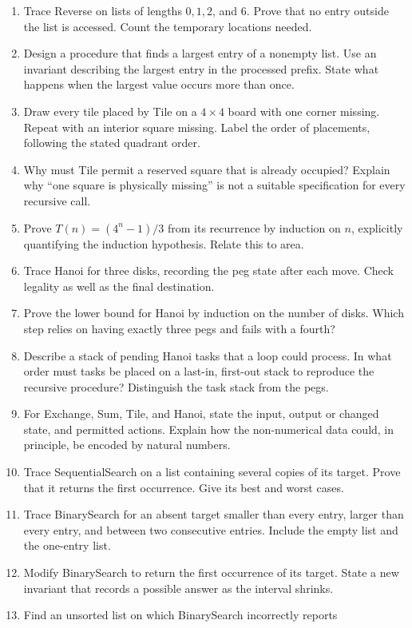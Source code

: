 \begin{enumerate}
\item Trace Reverse on lists of lengths $0,1,2$, and $6$. Prove that no
entry outside the list is accessed. Count the temporary locations needed.
\item Design a procedure that finds a largest entry of a nonempty list.
Use an invariant describing the largest entry in the processed prefix.
State what happens when the largest value occurs more than once.
\item Draw every tile placed by Tile on a $4\times4$ board with one
corner missing. Repeat with an interior square missing. Label the order
of placements, following the stated quadrant order.
\item Why must Tile permit a reserved square that is already occupied?
Explain why ``one square is physically missing'' is not a suitable
specification for every recursive call.
\item Prove $T(n)=(4^n-1)/3$ from its recurrence by induction on $n$,
explicitly quantifying the induction hypothesis. Relate this to area.
\item Trace Hanoi for three disks, recording the peg state after each
move. Check legality as well as the final destination.
\item Prove the lower bound for Hanoi by induction on the number of disks.
Which step relies on having exactly three pegs and fails with a fourth?
\item Describe a stack of pending Hanoi tasks that a loop could process.
In what order must tasks be placed on a last-in, first-out stack to reproduce
the recursive procedure? Distinguish the task stack from the pegs.
\item For Exchange, Sum, Tile, and Hanoi, state the input, output or changed
state, and permitted actions. Explain how the non-numerical data could,
in principle, be encoded by natural numbers.
\item Trace SequentialSearch on a list containing several copies of its target.
Prove that it returns the first occurrence. Give its best and worst cases.
\item Trace BinarySearch for an absent target smaller than every entry,
larger than every entry, and between two consecutive entries. Include the
empty list and the one-entry list.
\item Modify BinarySearch to return the first occurrence of its target.
State a new invariant that records a possible answer as the interval shrinks.
\item Find an unsorted list on which BinarySearch incorrectly reports

\end{enumerate}
